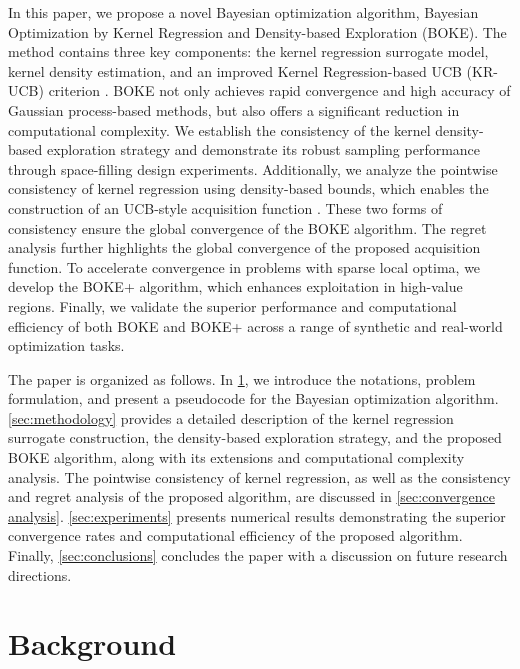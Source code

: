 \documentclass[11pt,en]{elegantpaper}
\newcommand{\1}{\mathds{1}}
\begin{document}
In this paper, we propose a novel Bayesian optimization algorithm, Bayesian Optimization by Kernel Regression and Density-based Exploration (BOKE). The method contains three key components: the kernel regression surrogate model, kernel density estimation, and an improved Kernel Regression-based UCB (KR-UCB) criterion \cite{yee2016monte}. BOKE not only achieves rapid convergence and high accuracy of Gaussian process-based methods, but also offers a significant reduction in computational complexity.
We establish the consistency of the kernel density-based exploration strategy and demonstrate its robust sampling performance through space-filling design experiments. Additionally, we analyze the pointwise consistency of kernel regression using density-based bounds, which enables the construction of an UCB-style acquisition function \cite{auer2002finite}. These two forms of consistency ensure the global convergence of the BOKE algorithm.
The regret analysis further highlights the global convergence of the proposed acquisition function. To accelerate convergence in problems with sparse local optima, we develop the BOKE+ algorithm, which enhances exploitation in high-value regions. Finally, we validate the superior performance and computational efficiency of both BOKE and BOKE+ across a range of synthetic and real-world optimization tasks.


The paper is organized as follows. In \cref{sec:background}, we introduce the notations, problem formulation, and present a pseudocode for the Bayesian optimization algorithm. \cref{sec:methodology} provides a detailed description of the kernel regression surrogate construction, the density-based exploration strategy, and the proposed BOKE algorithm, along with its extensions and computational complexity analysis. The pointwise consistency of kernel regression, as well as the consistency and regret analysis of the proposed algorithm, are discussed in \cref{sec:convergence analysis}. \cref{sec:experiments} presents numerical results demonstrating the superior convergence rates and computational efficiency of the proposed algorithm. Finally, \cref{sec:conclusions} concludes the paper with a discussion on future research directions.




\section{Background}
\label{sec:background}
\end{document}
